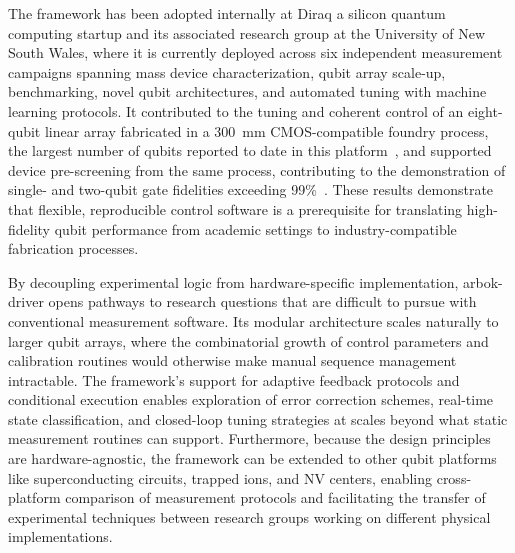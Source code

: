 \documentclass[numbers, preprint, twocolumn,10pt]{elsarticle}
\begin{document}
The framework has been adopted internally at Diraq a silicon quantum computing startup and its associated research group at the University of New South Wales, where it is currently deployed across six independent measurement campaigns spanning mass device characterization, qubit array scale-up, benchmarking, novel qubit architectures, and automated tuning with machine learning protocols. It contributed to the tuning and coherent control of an eight-qubit linear array fabricated in a \SI{300}{\milli\meter} CMOS-compatible foundry process, the largest number of qubits reported to date in this platform~\cite{nickl_eight-qubit_2025}, and supported device pre-screening from the same process, contributing to the demonstration of single- and two-qubit gate fidelities exceeding 99\%~\cite{steinacker_industry-compatible_2025}. These results demonstrate that flexible, reproducible control software is a prerequisite for translating high-fidelity qubit performance from academic settings to industry-compatible fabrication processes.

By decoupling experimental logic from hardware-specific implementation, arbok-driver opens pathways to research questions that are difficult to pursue with conventional measurement software. Its modular architecture scales naturally to larger qubit arrays, where the combinatorial growth of control parameters and calibration routines would otherwise make manual sequence management intractable. The framework's support for adaptive feedback protocols and conditional execution enables exploration of error correction schemes, real-time state classification, and closed-loop tuning strategies at scales beyond what static measurement routines can support. Furthermore, because the design principles are hardware-agnostic, the framework can be extended to other qubit platforms like superconducting circuits, trapped ions, and NV centers, enabling cross-platform comparison of measurement protocols and facilitating the transfer of experimental techniques between research groups working on different physical implementations.
\end{document}
